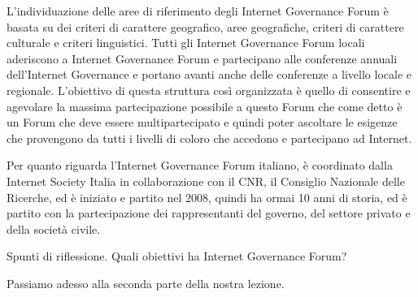  L'individuazione delle aree di riferimento degli Internet Governance Forum è basata su dei criteri di carattere geografico, aree geografiche, criteri di carattere culturale e criteri linguistici. Tutti gli Internet Governance Forum locali aderiscono a Internet Governance Forum e partecipano alle conferenze annuali dell'Internet Governance e portano avanti anche delle conferenze a livello locale e regionale. L'obiettivo di questa struttura così organizzata è quello di consentire e agevolare la massima partecipazione possibile a questo Forum che come detto è un Forum che deve essere multipartecipato e quindi poter ascoltare le esigenze che provengono da tutti i livelli di coloro che accedono e partecipano ad Internet.\par 
 Per quanto riguarda l'Internet Governance Forum italiano, è coordinato dalla Internet Society Italia in collaborazione con il CNR, il Consiglio Nazionale delle Ricerche, ed è iniziato e partito nel 2008, quindi ha ormai 10 anni di storia, ed è partito con la partecipazione dei rappresentanti del governo, del settore privato e della società civile.\par 
 Spunti di riflessione. Quali obiettivi ha Internet Governance Forum? \par
 Passiamo adesso alla seconda parte della nostra lezione. 
 
